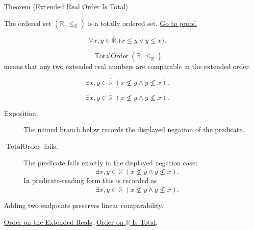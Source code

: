 \begin{theorembox}{Theorem (Extended Real Order Is Total)}
\begin{theorem}
\label{thm:extended-real-order-is-total}
The ordered set $(\overline{\mathbb{R}},\le_{\overline{\mathbb{R}}})$ is a
totally ordered set.
\hyperref[prf:extended-real-order-is-total]{Go to proof.}
\end{theorem}
\end{theorembox}
\begin{remark*}
\[
\forall x,y\in\overline{\mathbb{R}}\;
\bigl(x\le y\lor y\le x\bigr).
\]
\end{remark*}
\begin{remark*}
\[
\operatorname{TotalOrder}(\overline{\mathbb{R}},\le_{\overline{\mathbb{R}}})
\]
means that any two extended real numbers are comparable in the extended order.
\end{remark*}
\begin{remark*}
\[
\exists x,y\in\overline{\mathbb{R}}\;(x\nleq y\land y\nleq x).
\]
\end{remark*}

\begin{remark*}
\[
  \exists x,y\in\overline{\mathbb{R}}\;(x\nleq y\land y\nleq x).
\]
\end{remark*}

\begin{remark*}
\begin{description}
  \item[Exposition.] The named branch below records the displayed negation of the predicate.
  \item[\(\operatorname{TotalOrder}\) fails.] The predicate fails exactly in the displayed negation case:
  \[
  \exists x,y\in\overline{\mathbb{R}}\;(x\nleq y\land y\nleq x).
  \]
  In predicate-reading form this is recorded as
  \[
    \exists x,y\in\overline{\mathbb{R}}\;(x\nleq y\land y\nleq x).
  \]
\end{description}
\end{remark*}
\begin{remark*}[Interpretation]
Adding two endpoints preserves linear comparability.
\end{remark*}
\begin{dependencies}
\hyperref[def:extended-real-order]{Order on the Extended Reals};
\hyperref[thm:order-on-r-total]{Order on $\mathbb{R}$ Is Total}.
\end{dependencies}

